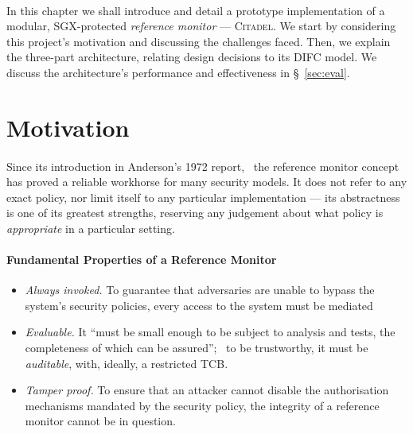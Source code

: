 

\paragraph{} In this chapter we shall introduce and detail a prototype implementation of a modular, SGX-protected \textit{reference monitor} --- \textsc{Citadel}. We start by considering this project's motivation and discussing the challenges faced. Then, we explain the three-part architecture, relating design decisions to its DIFC model. We discuss the architecture's performance and effectiveness in §~\ref{sec:eval}.

\section{Motivation}
\paragraph{} Since its introduction in Anderson's 1972 report,~\cite{reference-monitor} the reference monitor concept has proved a reliable workhorse for many security models. It does not refer to any exact policy, nor limit itself to any particular implementation --- its abstractness is one of its greatest strengths, reserving any judgement about what policy is \textit{appropriate} in a particular setting.~\cite{irvine-rm}

\paragraph{Fundamental Properties of a Reference Monitor}

\begin{itemize}
    \item \textit{Always invoked.} To guarantee that adversaries are unable to bypass the system's security policies, every access to the system must be mediated
    \item \textit{Evaluable.} It ``must be small enough to be subject to analysis and tests, the completeness of which can be assured'';~\cite{reference-monitor} to be trustworthy, it must be \textit{auditable}, with, ideally, a restricted TCB.
    \item \textit{Tamper proof.} To ensure that an attacker cannot disable the authorisation mechanisms mandated by the security policy, the integrity of a reference monitor cannot be in question.
\end{itemize}

